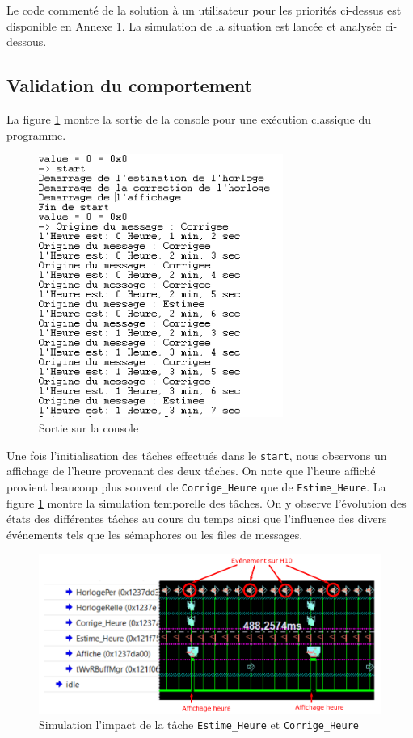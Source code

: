 \documentclass[french]{article}
\begin{document}
	Le code commenté de la solution à un utilisateur pour les priorités ci-dessus est disponible en Annexe 1. La simulation de la situation est lancée et analysée ci-dessous.
	
	\subsection{Validation du comportement}
	
	La figure \ref{fig:affichage_comportement_normal} montre la sortie de la console pour une exécution classique du programme.
		
	\begin{figure}[H]
		\centering
		\includegraphics[width=8cm]{photo/affichage_normal/affichage_comportement_normal}
		\caption{Sortie sur la console}
		\label{fig:affichage_comportement_normal}
	\end{figure}
	
	Une fois l'initialisation des tâches effectués dans le \texttt{start}, nous observons un affichage de l'heure provenant des deux tâches. On note que l'heure affiché provient beaucoup plus souvent de \texttt{Corrige\_Heure} que de \texttt{Estime\_Heure}. La figure \ref{fig:affichage_comportement_normal} montre la simulation temporelle des tâches. On y observe l'évolution des états des différentes tâches au cours du temps ainsi que l'influence des divers événements tels que les sémaphores ou les files de messages.  
	
	\begin{figure}[H]
		\centering
		\includegraphics[width=16cm]{photo/affichage_normal/comportement_normal_fois_3}
		\caption{Simulation l'impact de la tâche \texttt{Estime\_Heure} et \texttt{Corrige\_Heure}}
		\label{fig:comportement_normal_fois_3}
	\end{figure}
	
\end{document}
